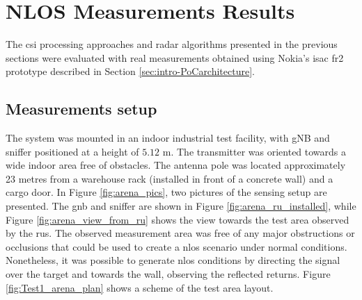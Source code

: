 \chapter{NLOS Measurements Results}

The \gls{csi} processing approaches and radar algorithms presented in the previous sections were evaluated with real measurements obtained using Nokia's \gls{isac} \gls{fr2} prototype described in Section \ref{sec:intro-PoCarchitecture}.

\section{Measurements setup}
\label{sec:Test1_meas_scenario}

The system was mounted in an indoor industrial test facility, with gNB and sniffer positioned at a height of $5.12$ m.
The transmitter was oriented towards a wide  indoor area free of obstacles. The antenna pole was located approximately 23 metres from a warehouse rack (installed in front of a concrete wall) and a cargo door.
In Figure \ref{fig:arena_pics}, two pictures of the sensing setup are presented. The \gls{gnb} and sniffer are shown in Figure \ref{fig:arena_ru_installed}, while Figure \ref{fig:arena_view_from_ru} shows the view towards the test area observed by the \glspl{ru}.
The observed measurement area was free of any major obstructions or occlusions that could be used to create a \gls{nlos} scenario under normal conditions.
Nonetheless, it was possible to generate \gls{nlos} conditions by directing the signal over the target and towards the wall, observing the reflected returns.
Figure \ref{fig:Test1_arena_plan} shows a scheme of the test area layout.

